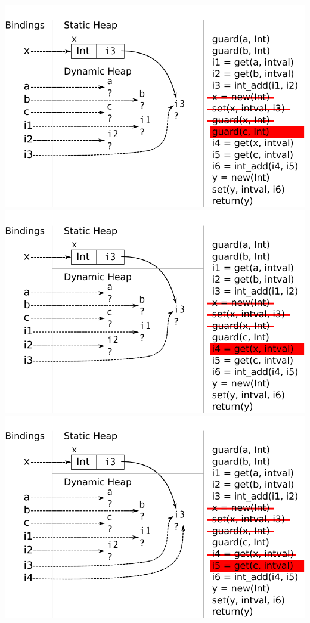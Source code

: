 \documentclass[utf8x]{beamer}
\begin{document}
\begin{frame}[plain]
{\includegraphics[scale=0.8]{figures/ex09}}
{\includegraphics[scale=0.8]{figures/ex10}}
{\includegraphics[scale=0.8]{figures/ex11}}

\end{frame}
\end{document}
